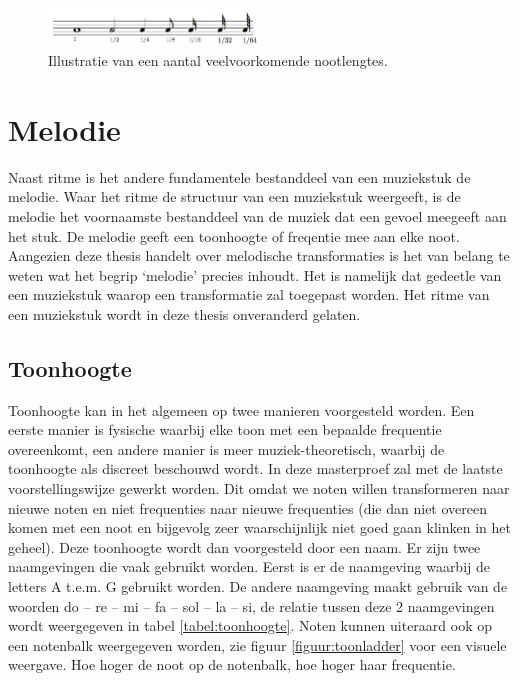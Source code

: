 \begin{figure}[!ht]
  \centering
  \includegraphics[width=0.5\textwidth]{1_Muzikale_Achtergrond/nootlengtes}
  \caption{Illustratie van een aantal veelvoorkomende nootlengtes.}
  \label{figuur:nootlengtes}
\end{figure}

\section{Melodie}
Naast ritme is het andere fundamentele bestanddeel van een muziekstuk de melodie. Waar het ritme de structuur van een muziekstuk weergeeft, is de melodie het voornaamste bestanddeel van de muziek dat een gevoel meegeeft aan het stuk. De melodie geeft een toonhoogte of freqentie mee aan elke noot. Aangezien deze thesis handelt over melodische transformaties is het van belang te weten wat het begrip `melodie' precies inhoudt. Het is namelijk dat gedeetle van een muziekstuk waarop een transformatie zal toegepast worden. Het ritme van een muziekstuk wordt in deze thesis onveranderd gelaten.

\subsection{Toonhoogte}
Toonhoogte kan in het algemeen op twee manieren voorgesteld worden. Een eerste manier is fysische waarbij elke toon met een bepaalde frequentie overeenkomt, een andere manier is meer muziek-theoretisch, waarbij de toonhoogte als discreet beschouwd wordt. In deze masterproef zal met de laatste voorstellingswijze gewerkt worden. Dit omdat we noten willen transformeren naar nieuwe noten en niet frequenties naar nieuwe frequenties (die dan niet overeen komen met een noot en bijgevolg zeer waarschijnlijk niet goed gaan klinken in het geheel). Deze toonhoogte wordt dan voorgesteld door een naam. Er zijn twee naamgevingen die vaak gebruikt worden. Eerst is er de naamgeving waarbij de letters A t.e.m. G gebruikt worden. De andere naamgeving maakt gebruik van de woorden do -- re -- mi -- fa -- sol -- la -- si, de relatie tussen deze 2 naamgevingen wordt weergegeven in tabel \ref{tabel:toonhoogte}. Noten kunnen uiteraard ook op een notenbalk weergegeven worden, zie figuur \ref{figuur:toonladder} voor een visuele weergave. Hoe hoger de noot op de notenbalk, hoe hoger haar frequentie.

